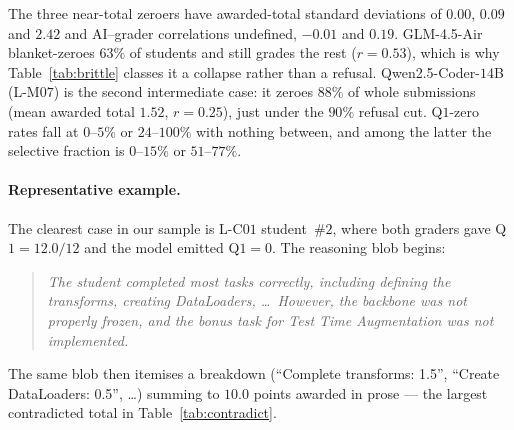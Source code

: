 The three near-total zeroers have awarded-total standard deviations of $0.00$, $0.09$ and $2.42$ and AI--grader correlations undefined, $-0.01$ and $0.19$. GLM-4.5-Air blanket-zeroes $63\%$ of students and still grades the rest ($r = 0.53$), which is why Table~\ref{tab:brittle} classes it a collapse rather than a refusal. Qwen2.5-Coder-$14$B (L-M$07$) is the second intermediate case: it zeroes $88\%$ of whole submissions (mean awarded total $1.52$, $r = 0.25$), just under the $90\%$ refusal cut. Q$1$-zero rates fall at $0$--$5\%$ or $24$--$100\%$ with nothing between, and among the latter the selective fraction is $0$--$15\%$ or $51$--$77\%$.

\begin{table}[h]
\centering
\caption{Self-contradiction between the structured Q$1$ score and the prose breakdown, on the two strict-persona runs whose rationales we annotated by hand. A row is self-contradicting when the structured score is $0$ but the rationale itemises positive partial credit. Both runs sit in the selective-field-collapse group of Table~\ref{tab:mechanism} and match its Q$1 = 0$ counts; the second column differs because this one requires reading the prose, which we did not do at scale.}
\label{tab:contradict}
\small
{}
\end{table}

\paragraph{Representative example.}
The clearest case in our sample is L-C$01$ student~$\#2$, where both graders gave Q$1 = 12.0 / 12$ and the model emitted Q$1 = 0$. The reasoning blob begins:
\begin{quote}\itshape
The student completed most tasks correctly, including defining the transforms, creating DataLoaders, \ldots\ However, the backbone was not properly frozen, and the bonus task for Test Time Augmentation was not implemented.
\end{quote}
The same blob then itemises a breakdown (``Complete transforms: 1.5'', ``Create DataLoaders: 0.5'', \ldots) summing to $10.0$ points awarded in prose --- the largest contradicted total in Table~\ref{tab:contradict}.

